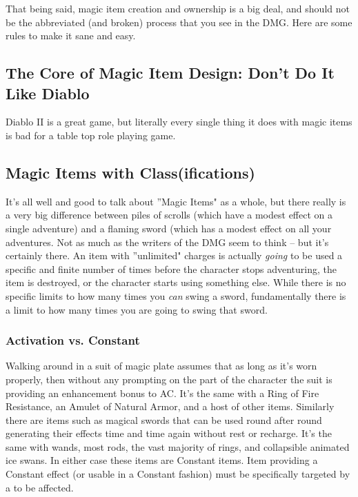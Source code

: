 That being said, magic item creation and ownership is a big deal, and should not be the abbreviated (and broken) process that you see in the DMG. Here are some rules to make it sane and easy.

\subsection{The Core of Magic Item Design: Don't Do It Like Diablo}

Diablo II is a great game, but literally every single thing it does with magic items is bad for a table top role playing game.

\subsection{Magic Items with Class(ifications)}

It's all well and good to talk about ''Magic Items" as a whole, but there really is a very big difference between piles of scrolls (which have a modest effect on a single adventure) and a flaming sword (which has a modest effect on all your adventures. Not as much as the writers of the DMG seem to think -- but it's certainly there. An item with ''unlimited" charges is actually \textit{going} to be used a specific and finite number of times before the character stops adventuring, the item is destroyed, or the character starts using something else. While there is no specific limits to how many times you \textit{can} swing a sword, fundamentally there is a limit to how many times you are going to swing that sword.

\subsubsection{Activation vs. Constant}

Walking around in a suit of magic plate assumes that as long as it's worn properly, then without any prompting on the part of the character the suit is providing an enhancement bonus to AC. It's the same with a Ring of Fire Resistance, an Amulet of Natural Armor, and a host of other items. Similarly there are items such as magical swords that can be used round after round generating their effects time and time again without rest or recharge. It's the same with wands, most rods, the vast majority of rings, and collapsible animated ice swans. In either case these items are Constant items. Item providing a Constant effect (or usable in a Constant fashion) must be specifically targeted by a  to be affected.

